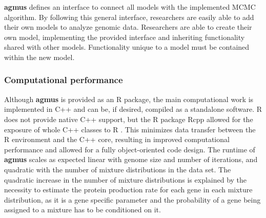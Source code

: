 \documentclass{bioinfo}
\newcommand{\package}{\textbf{agmus }} %
\begin{document}
\package defines an interface to connect all models with the implemented MCMC algorithm. 
By following this general interface, researchers are easily able to add their own models to analyze genomic data.
Researchers are able to create their own model, implementing the provided interface and inheriting functionality shared with other models.
Functionality unique to a model must be contained within the new model. 

\subsubsection*{Computational performance}
Although \package is provided as an R package, the main computational work is implemented in C++ and can be, if desired, compiled as a standalone software.
R does not provide native C++ support, but the R package Rcpp allowed for the exposure of whole C++ classes to R \citep{rcpp_package}.
This minimizes data transfer between the R environment and the C++ core, resulting in improved computational performance and allowed for a fully object-oriented code design. 
The runtime of \package scales as expected linear with genome size and number of iterations, and quadratic with the number of mixture distributions in the data set. The quadratic increase in the number of mixture distributions is explained by the necessity to estimate the protein production rate for each gene in each mixture distribution, as it is a gene specific parameter and the probability of a gene being assigned to a mixture has to be conditioned on it.  



\end{document}
